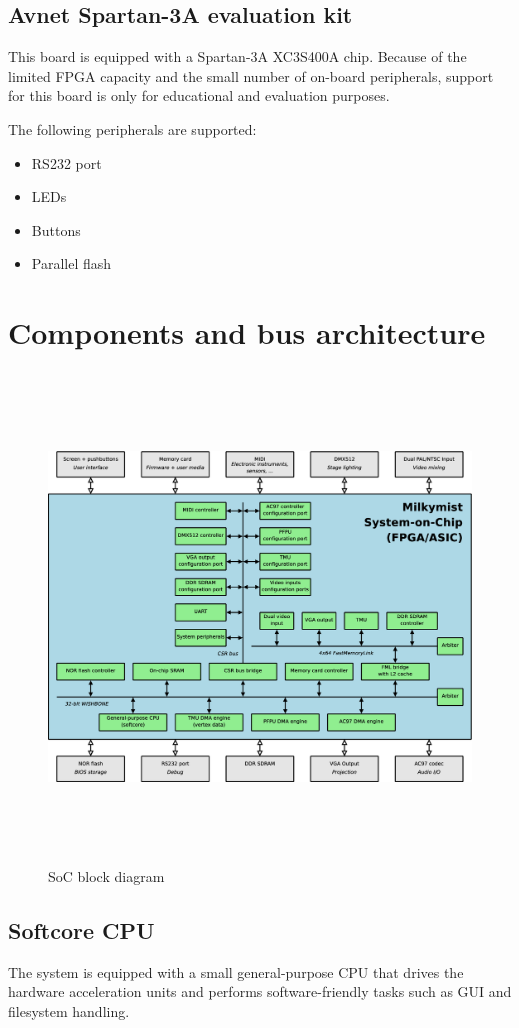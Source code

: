 \documentclass[a4paper,11pt]{article}
\begin{document}
\subsection{Avnet Spartan-3A evaluation kit}
This board is equipped with a Spartan-3A XC3S400A chip. Because of the limited FPGA capacity and the small number of on-board peripherals, support for this board is only for educational and evaluation purposes.

The following peripherals are supported:
\begin{itemize}
\item RS232 port
\item LEDs
\item Buttons
\item Parallel flash
\end{itemize}

\section{Components and bus architecture}

\begin{figure}[H]
\centering
\includegraphics[height=130mm]{soc_architecture.eps}
\caption{SoC block diagram}
\end{figure}

\subsection{Softcore CPU}
The system is equipped with a small general-purpose CPU that drives the hardware acceleration units and performs software-friendly tasks such as GUI and filesystem handling.
\end{document}
